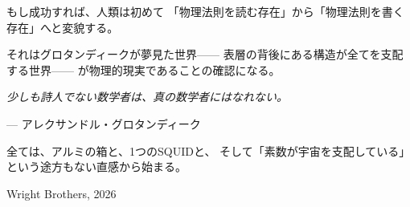 \documentclass[12pt,a4paper]{article}
\begin{document}
もし成功すれば、人類は初めて
「物理法則を読む存在」から「物理法則を書く存在」へと変貌する。

それはグロタンディークが夢見た世界——
表層の背後にある構造が全てを支配する世界——
が物理的現実であることの確認になる。

\begin{epigraph}
\textit{少しも詩人でない数学者は、真の数学者にはなれない。}

\hfill --- アレクサンドル・グロタンディーク
\end{epigraph}

全ては、アルミの箱と、1つのSQUIDと、
そして「素数が宇宙を支配している」という途方もない直感から始まる。

\vfill
\begin{center}
{\small Wright Brothers, 2026}
\end{center}
\end{document}
